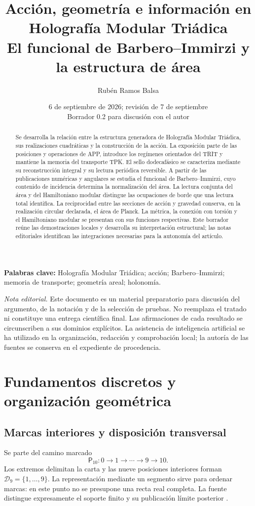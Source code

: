 \documentclass[11pt,a4paper]{article}
\title{\color{ink}Acción, geometría e información en Holografía Modular Triádica\\[5pt]\large El funcional de Barbero--Immirzi y la estructura de área}
\author{Rubén Ramos Balsa}
\date{\small 6 de septiembre de 2026; revisión de 7 de septiembre\\[3pt]
\textcolor{accent}{Borrador 0.2 para discusión con el autor}}
\numberwithin{equation}{section}
\theoremstyle{definition}
\begin{document}
\maketitle
\begin{abstract}
Se desarrolla la relación entre la estructura generadora de Holografía
Modular Triádica, sus realizaciones cuadráticas y la construcción de la
acción. La exposición parte de las posiciones y operaciones de APP,
introduce los regímenes orientados del TRIT y mantiene la memoria del
transporte TPK. El sello dodecafásico se caracteriza mediante su reconstrucción
integral y su lectura periódica reversible. A partir de las publicaciones
numéricas y angulares se estudia el funcional de Barbero--Immirzi, cuyo
contenido de incidencia determina la normalización del área.
La lectura conjunta del área y del Hamiltoniano modular distingue las
ocupaciones de borde que una lectura total identifica. La reciprocidad
entre las secciones de acción y gravedad conserva, en la realización
circular declarada, el área de Planck.
La métrica, la conexión con torsión y el Hamiltoniano modular se presentan
con sus funciones respectivas. Este borrador reúne las demostraciones
locales y desarrolla su interpretación estructural; las notas editoriales
identifican las integraciones necesarias para la autonomía del artículo.
\end{abstract}\noindent\textbf{Palabras clave:} Holografía Modular Triádica; acción; Barbero--Immirzi;
memoria de transporte; geometría areal; holonomía.
\medskip

\noindent\small\textit{Nota editorial.} Este documento es un material preparatorio
para discusión del argumento, de la notación y de la selección de pruebas.
No reemplaza el tratado ni constituye una entrega científica final.
Las afirmaciones de cada resultado se circunscriben a sus dominios explícitos.
La asistencia de inteligencia artificial se ha utilizado en la organización,
redacción y comprobación local; la autoría de las fuentes se conserva en el
expediente de procedencia.\normalsize
\clearpage

\section{Fundamentos discretos y organización geométrica}
\label{sec:inicio}
\subsection{Marcas interiores y disposición transversal}
Se parte del camino marcado
\[
\mathsf P_{10}:0\longrightarrow1\longrightarrow\cdots
\longrightarrow9\longrightarrow10.
\]
Los extremos delimitan la carta y las nueve posiciones interiores forman
$\mathcal D_9=\{1,\ldots,9\}$. La representación mediante un segmento
sirve para ordenar marcas: en este punto no se presupone una recta real
completa. La fuente distingue expresamente el soporte finito y su
publicación límite posterior \cite{segmento}.
\end{document}
